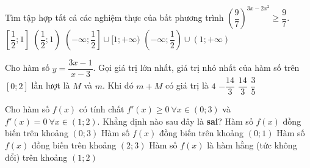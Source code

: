 \begin{ex}
Tìm tập hợp tất cả các nghiệm thực của bất phương trình $ \left ( \dfrac{9}{7} \right )^{ 3x - 2x^2 } \geq  \dfrac{9}{7}$.	
	\choice
	{\True $  \left [ \dfrac{1}{2}; 1 \right ] $}
	{$  \left ( \dfrac{1}{2}; 1 \right ) $}
	{$  \left (- \infty ; \dfrac{1}{2} \right ] \cup [1; + \infty )$}
	{$  \left (- \infty ; \dfrac{1}{2} \right )  \cup (1; + \infty) $}
\end{ex}	
\begin{ex}
Cho hàm số $ y = \dfrac{3x - 1}{x - 3} $.  Gọi giá trị lớn nhất, giá trị nhỏ nhất của hàm số trên $ [0;2] $ lần lượt là $ M $ và $ m $. Khi đó $ m + M $ có giá trị là 	
	\choice
	{$ 4 $}
	{\True $ - \dfrac{14}{3} $}
	{$ \dfrac{14}{3} $}
	{$ \dfrac{3}{5} $}
\end{ex}	
\begin{ex}
Cho hàm số $ f(x) $ có tính chất $ f'(x) \geq 0 \ \forall x \in (0;3) $ và $ f'(x) = 0 \ \forall x \in (1;2) $. Khẳng định nào sau đây là \textbf{sai}?	
	\choice
	{\True Hàm số $ f(x) $ đồng biến trên khoảng $ (0;3) $}
	{Hàm số $ f(x) $ đồng biến trên khoảng $ (0;1) $}
	{Hàm số $ f(x) $ đồng biến trên khoảng $ (2;3) $}
	{Hàm số $ f(x) $ là hàm hằng (tức không đổi) trên khoảng $ (1;2) $}
\end{ex}	
